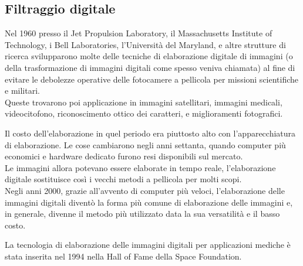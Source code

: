 \subsection{Filtraggio digitale}
\cite{storia}
Nel 1960 presso il Jet Propulsion Laboratory, il Massachusetts Institute of Technology, i Bell Laboratories, l'Università del Maryland, e altre strutture di ricerca svilupparono molte delle tecniche di elaborazione digitale di immagini (o della trasformazione di immagini digitali come spesso veniva chiamata) al fine di evitare le debolezze operative delle fotocamere a pellicola per missioni scientifiche e militari.\\
Queste trovarono poi applicazione in immagini satellitari, immagini medicali, videocitofono, riconoscimento ottico dei caratteri, e miglioramenti fotografici.

Il costo dell'elaborazione in quel periodo era piuttosto alto con l'apparecchiatura di elaborazione. Le cose cambiarono negli anni settanta, quando computer più economici e hardware dedicato furono resi disponibili sul mercato.\\
Le immagini allora potevano essere elaborate in tempo reale, l'elaborazione digitale sostituisce così i vecchi metodi a pellicola per molti scopi.\\

\vspace{1em}
Negli anni 2000, grazie all'avvento di computer più veloci, l'elaborazione delle immagini digitali diventò la forma più comune di elaborazione delle immagini e, in generale, divenne il metodo più utilizzato data la sua versatilità e il basso costo.

La tecnologia di elaborazione delle immagini digitali per applicazioni mediche è stata inserita nel 1994 nella Hall of Fame della Space Foundation.\\
